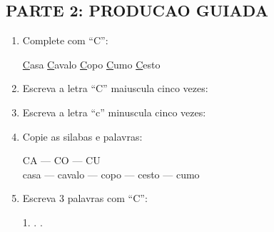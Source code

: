 \begin{exercicio}
\subsection*{PARTE 2: PRODUCAO GUIADA}

\begin{enumerate}[resume]
  \item Complete com ``C'':
  \begin{center}
  \underline{C}asa \quad \underline{C}avalo \quad \underline{C}opo \quad \underline{C}umo \quad \underline{C}esto
  \end{center}

  \item Escreva a letra ``C'' maiuscula cinco vezes:
  \begin{center}
  \underline{\hspace{1.5cm}} \quad \underline{\hspace{1.5cm}} \quad \underline{\hspace{1.5cm}} \quad \underline{\hspace{1.5cm}} \quad \underline{\hspace{1.5cm}}
  \end{center}

  \item Escreva a letra ``c'' minuscula cinco vezes:
  \begin{center}
  \underline{\hspace{1.5cm}} \quad \underline{\hspace{1.5cm}} \quad \underline{\hspace{1.5cm}} \quad \underline{\hspace{1.5cm}} \quad \underline{\hspace{1.5cm}}
  \end{center}

  \item Copie as silabas e palavras:
  \begin{center}
  CA --- CO --- CU\\
  casa --- cavalo --- copo --- cesto --- cumo
  \end{center}

  \item Escreva 3 palavras com ``C'':
  \begin{center}
  1. \underline{\hspace{4cm}} . \underline{\hspace{4cm}} . \underline{\hspace{4cm}}
  \end{center}
\end{enumerate}


\end{exercicio}
